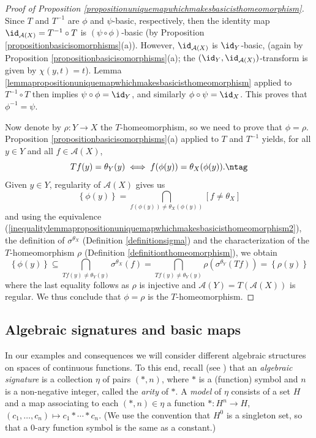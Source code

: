 \begin{proof}[Proof of Proposition \ref{propositionuniquemapwhichmakesbasicisthomeomorphism}]
Since $T$ and $T^{-1}$ are $\phi$ and $\psi$-basic, respectively, then the identity map $\id_{\mathcal{A}(X)}=T^{-1}\circ T$ is $(\psi\circ\phi)$-basic (by Proposition \ref{propositionbasicisomorphisms}(a)). However, $\id_{\mathcal{A}(X)}$ is $\id_Y$-basic, (again by Proposition \ref{propositionbasicisomorphisms}(a); the $(\id_Y,\id_{\mathcal{A}(X)})$-transform is given by $\chi(y,t)=t$). Lemma \ref{lemmapropositionuniquemapwhichmakesbasicisthomeomorphism} applied to $T^{-1}\circ T$ then implies $\psi\circ\phi=\id_Y$, and similarly $\phi\circ\psi=\id_X$. This proves that $\phi^{-1}=\psi$.

Now denote by $\rho:Y\to X$ the $T$-homeomorphism, so we need to prove that $\phi=\rho$. Proposition \ref{propositionbasicisomorphisms}(a) applied to $T$ and $T^{-1}$ yields, for all $y\in Y$ and all $f\in\mathcal{A}(X)$,
\[Tf(y)=\theta_Y(y)\iff f(\phi(y))=\theta_X(\phi(y)).\ntag\label{inequalitylemmapropositionuniquemapwhichmakesbasicisthomeomorphism2}\]
Given $y\in Y$, regularity of $\mathcal{A}(X)$ gives us
\[\left\{\phi(y)\right\}=\bigcap_{f(\phi(y))\neq\theta_X(\phi(y))}[f\neq\theta_X]\]
and using the equivalence (\ref{inequalitylemmapropositionuniquemapwhichmakesbasicisthomeomorphism2}), the definition of $\sigma^{\theta_X}$ (Definition \ref{definitionsigma}) and the characterization of the $T$-homeomorphism $\rho$ (Definition \ref{definitionthomeomorphism}), we obtain
\[\left\{\phi(y)\right\}\subseteq\bigcap_{Tf(y)\neq\theta_Y(y)}\sigma^{\theta_X}(f)=\bigcap_{Tf(y)\neq\theta_Y(y)}\rho(\sigma^{\theta_Y}(Tf))=\left\{\rho(y)\right\}\]
where the last equality follows as $\rho$ is injective and $\mathcal{A}(Y)=T(\mathcal{A}(X))$ is regular. We thus conclude that $\phi=\rho$ is the $T$-homeomorphism.\qedhere
\end{proof}

\subsection{Algebraic signatures and basic maps}

In our examples and consequences we will consider different algebraic structures on spaces of continuous functions. To this end, recall (see \cite{MR1221741}) that an \emph{algebraic signature} is a collection $\eta$ of pairs $(*,n)$, where $*$  is a (function) symbol and $n$ is a non-negative integer, called the \emph{arity} of $*$. A \emph{model} of $\eta$ consists of a set $H$ and a map associating to each $(*,n)\in\eta$ a function $*:H^n\to H$, $(c_1,\ldots,c_n)\mapsto c_1*\cdots*c_n$. (We use the convention that $H^0$ is a singleton set, so that a $0$-ary function symbol is the same as a constant.)

